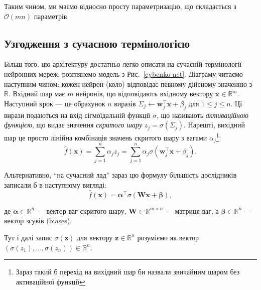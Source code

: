 Таким чином, ми маємо відносно просту параметризацію, що складається з
$\mathcal{O}(mn)$ параметрів. 

\subsection{Узгодження з сучасною термінологією}
Більш того, цю архітектуру достатньо легко описати
на сучасній термінології нейронних мереж: розглянемо модель з
Рис.~\ref{cybenko-net}. Діаграму читаємо наступним чином: кожен нейрон (коло)
відповідає певному дійсному значенню з $\mathbb{R}$. Вхідний шар має $m$
нейронів, що відповідають вхідному вектору $\mathbf{x} \in \mathbb{R}^m$.
Наступний крок --- це обрахунок $n$ виразів $\Sigma_j \gets
\boldsymbol{w}_j^{\top}\mathbf{x}+\beta_j$ для $1 \leq j \leq n$. Ці вирази
подаються на вхід сігмоїдальній функції $\sigma$, що називають
\textit{активаційною функцією}, що видає значення \textit{скритого шару} $z_j =
\sigma(\Sigma_j)$. Нарешті, вихідний шар це просто лінійна комбінація значень
скритого шару з вагами $\alpha_j$\footnote{Зараз такий б перехід на вихідний шар
би назвали звичайним шаром без активаційної функції}:
\begin{equation*}
	\widehat{f}(\mathbf{x}) = \sum_{j=1}^n \alpha_j z_j = \sum_{j=1}^n \alpha_j \sigma(\boldsymbol{w}_j^{\top}\mathbf{x} + \beta_j).
\end{equation*}

Альтернативно, ``на сучасний лад'' зараз цю формулу більшість дослідників записали б в наступному вигляді:
\begin{equation*}\label{eq:modern_cybenko}
	\widehat{f}(\mathbf{x}) = \boldsymbol{\alpha}^{\top}\sigma(\boldsymbol{W}\mathbf{x} + \boldsymbol{\beta}),
\end{equation*}

де $\boldsymbol{\alpha} \in \mathbb{R}^n$ --- вектор ваг скритого шару,
$\boldsymbol{W} \in \mathbb{R}^{m \times n}$ --- матриця ваг, а
$\boldsymbol{\beta} \in \mathbb{R}^n$ --- вектор зсувів (biases). 
\begin{remark}
    Тут і далі запис $\sigma(\mathbf{z})$ для вектору $\mathbf{z} \in
    \mathbb{R}^n$ розуміємо як вектор $(\sigma(z_1),\dots,\sigma(z_n)) \in \mathbb{R}^n$.
\end{remark}

